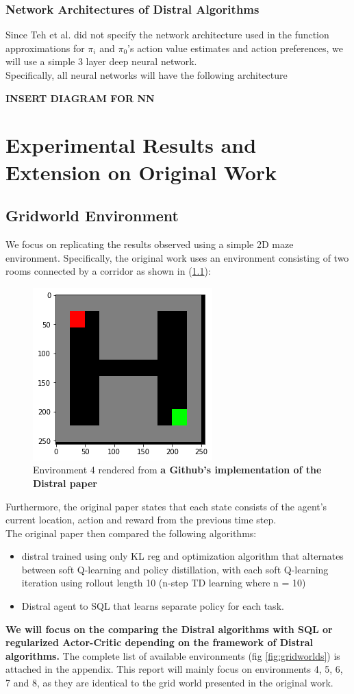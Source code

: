 \documentclass[12pt]{report}
\begin{document}
\subsection{Network Architectures of Distral Algorithms}

Since Teh et al. \cite{teh2017distral} did not specify the network architecture used in the function approximations for $\pi_i$ and $\pi_0$'s action value estimates and action preferences, we will use a simple 3 layer deep neural network.\\

Specifically, all neural networks will have the following architecture

\textbf{INSERT DIAGRAM FOR NN}

\chapter{Experimental Results and Extension on Original Work}
\section{Gridworld Environment}

We focus on replicating the results observed using a simple 2D maze environment. Specifically, the original work \cite{teh2017distral} uses an environment consisting of two rooms connected by a corridor as shown in (\ref{fig4.1}):
\begin{figure}[H]
    \center
    \includegraphics[width=0.3\linewidth]{figs/grid4.png}
    \caption{Environment 4 rendered from \textbf{a Github's implementation of the Distral paper}}
    \label{fig4.1}
\end{figure}
Furthermore, the original paper states that each state consists of the agent's current location, action and reward from the previous time step.\\

The original paper then compared the following algorithms:
\begin{itemize}
    \item distral trained using only KL reg and optimization algorithm that alternates between soft Q-learning and policy distillation, with each soft Q-learning iteration using rollout length 10 (n-step TD learning where n = 10)
    \item Distral agent to SQL that learns separate policy for each task.
\end{itemize}
\textbf{We will focus on the comparing the Distral algorithms with SQL or regularized Actor-Critic depending on the framework of Distral algorithms.} The complete list of available environments (fig \ref{fig:gridworlds}) is attached in the appendix. This report will mainly focus on environments 4, 5, 6, 7 and 8, as they are identical to the grid world presented in the original work.
\end{document}
